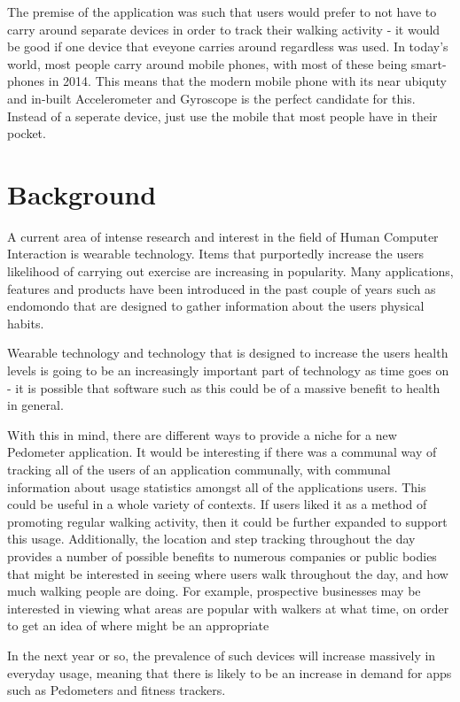 \documentclass{l4proj}
\begin{document}
The premise of the application was such that users would prefer to not have to carry around separate devices in order to track their walking activity - it would be good if one device that eveyone carries around regardless was used. In today's world, most people carry around mobile phones, with most of these being smart-phones in 2014. This means that the modern mobile phone with its near ubiquty and in-built Accelerometer and Gyroscope is the perfect candidate for this. Instead of a seperate device, just use the mobile that most people have in their pocket.

\section{Background}

A current area of intense research and interest in the field of Human Computer Interaction is wearable technology. Items that purportedly increase the users likelihood of carrying out exercise are increasing in popularity. Many applications, features and products have been introduced in the past couple of years such as endomondo that are designed to gather information about the users physical habits. 

Wearable technology and technology that is designed to increase the users health levels is going to be an increasingly important part of technology as time goes on - it is possible that software such as this could be of a massive benefit to health in general.

With this in mind, there are different ways to provide a niche for a new Pedometer application. It would be interesting if there was a communal way of tracking all of the users of an application communally, with communal information about usage statistics amongst all of the applications users. This could be useful in a whole variety of contexts. If users liked it as a method of promoting regular walking activity, then it could be further expanded to support this usage. Additionally, the location and step tracking throughout the day provides a number of possible benefits to numerous companies or public bodies that might be interested in seeing where users walk throughout the day, and how much walking people are doing. For example, prospective businesses may be interested in viewing what areas are popular with walkers at what time, on order to get an idea of where might be an appropriate 

In the next year or so, the prevalence of such devices will increase massively in everyday usage, meaning that there is likely to be an increase in demand for apps such as Pedometers and fitness trackers. 
\end{document}
